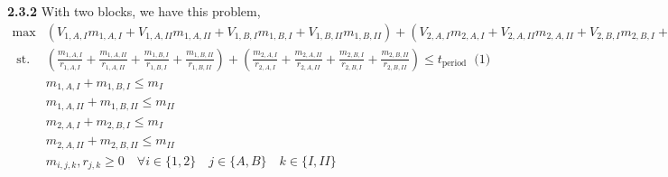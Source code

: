 \documentclass[11pt]{article}
\begin{document}
\noindent \textbf{2.3.2} With two blocks, we have this problem, 
\\

$\begin{aligned} 
    \max & \left(V_{1,A, I} m_{1,A, I}+V_{1,A, II} m_{1,A, II}+V_{1,B, I} m_{1,B, I}+V_{1,B, II} m_{1,B, II}\right) + \left(V_{2,A, I} m_{2,A, I}+V_{2,A, II} m_{2,A, II}+V_{2,B, I} m_{2,B, I}+V_{2,B, II} m_{2,B, II}\right) \\ 
    \text { st. } &   \left(\frac{m_{1,A, I}}{r_{1,A, I}}+\frac{m_{1,A, II}}{r_{1,A, II}}+\frac{m_{1,B, I}}{r_{1,B, I}}+\frac{m_{1,B, II}}{r_{1,B, II}}\right) + \left(\frac{m_{2,A, I}}{r_{2,A, I}}+\frac{m_{2,A, II}}{r_{2,A, II}}+\frac{m_{2,B, I}}{r_{2,B, I}}+\frac{m_{2,B, II}}{r_{2,B, II}}\right) \leqslant t_{\text {period }} \text { (1) } \\ 
    & m_{1,A, I}+m_{1,B, I} \leqslant m_{I}  \\ 
    & m_{1,A, II}+m_{1,B, II} \leqslant m_{II}  \\ 
    & m_{2,A, I}+m_{2,B, I} \leqslant m_{I}  \\ 
    & m_{2,A, II}+m_{2,B, II} \leqslant m_{II}  \\ 
    & m_{i,j,k}, r_{j,k} \geqslant 0 \quad \forall i \in \{1,2\} \quad j \in \{A,B\} \quad k \in \{I,II\}
\end{aligned}$
\end{document}
